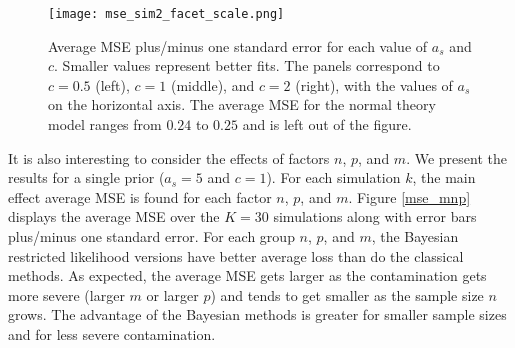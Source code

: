 \documentclass[ba]{imsart}
\newcommand{\response}[1]{{\color{blue}#1}}
\begin{document}
 
\begin{figure}[t]
\centering
\texttt{[image: mse\_sim2\_facet\_scale.png]}
\caption{Average MSE plus/minus one standard error for each value of $a_{s}$ and $c$. Smaller values represent better fits. The panels correspond to $c = 0.5$ (left), $c=1$ (middle), and $c=2$ (right), with the values of $a_{s}$ on the horizontal axis. The average MSE for the normal theory model ranges from $0.24$ to $0.25$ and is left out of the figure.}
\label{mse_sim}
\end{figure}

\response{It is also interesting to consider the effects of factors $n$, $p$, and $m$.  We present the results for a single prior ($a_s = 5$ and $c = 1$).  For each simulation $k$, the main effect average MSE is found for each factor $n$, $p$, and $m$. Figure \ref{mse_mnp} displays the average MSE over the $K = 30$ simulations along with error bars plus/minus one standard error. For each group $n$, $p$, and $m$, the Bayesian restricted likelihood versions have better average loss than do the classical methods. As expected, the average MSE gets larger as the contamination gets more severe (larger $m$ or larger $p$) and tends to get smaller as the sample size $n$ grows.  The advantage of the Bayesian methods is greater for smaller sample sizes and for less severe contamination.}
\end{document}
